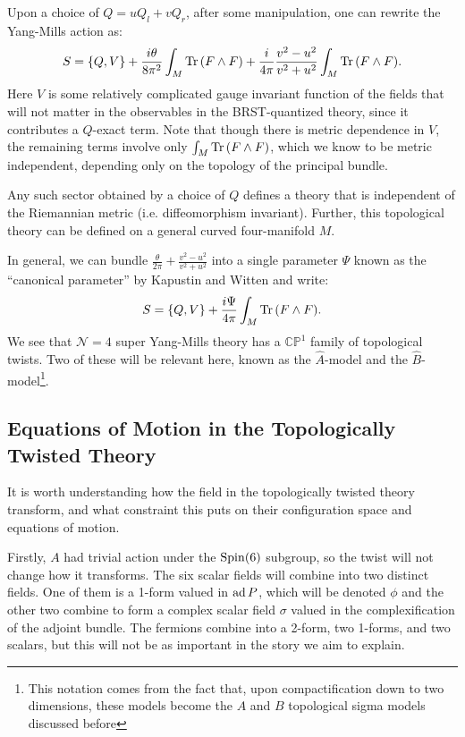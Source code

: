	Upon a choice of $Q = u Q_l + v Q_r$, after some manipulation, one can rewrite the Yang-Mills action as:
	\begin{equation}
		S = \{ Q , V \} + \frac{i \theta}{8\pi^2} \int_M \mathrm{Tr}\,(F \wedge F) + \frac{i}{4\pi} \frac{v^2-u^2}{v^2+u^2} \int_M \mathrm{Tr}\, (F \wedge F).
	\end{equation}
	Here $V$ is some relatively complicated gauge invariant function of the fields that will not matter in the observables in the BRST-quantized theory, since it contributes a $Q$-exact term. Note that though there is metric dependence in $V$, the remaining terms involve only $\int_M \mathrm{Tr}\, (F \wedge F)$, which we know to be metric independent, depending only on the topology of the principal bundle. 
	
	\begin{fact}
		Any such sector obtained by a choice of $Q$ defines a theory that is independent of the Riemannian metric (i.e. diffeomorphism invariant). Further, this topological theory can be defined on a general curved four-manifold $M$.
	\end{fact}
	
	In general, we can bundle $\frac{\theta}{2\pi} +  \frac{v^2-u^2}{v^2+u^2}$ into a single parameter $\Psi$ known as the ``canonical parameter'' by Kapustin and Witten \cite{kapustin2006} and write:
	\[
		S = \{ Q, V\} + \frac{i \Psi}{4\pi} \int_M \mathrm{Tr}\, (F \wedge F).
	\]
	We see that $\mathcal N = 4$ super Yang-Mills theory has a $\mathbb{CP}^1$ family of topological twists. 
	Two of these will be relevant here, known as the $\hat A$-model and the $\hat B$-model\footnote{This notation comes from the fact that, upon compactification down to two dimensions, these models become the $A$ and $B$ topological sigma models discussed before}. %
	

\subsection{Equations of Motion in the Topologically Twisted Theory} %
\label{sub:equations_of_motion_in_the_topologically_twisted_theory}

	It is worth understanding how the field in the topologically twisted theory transform, and what constraint this puts on their configuration space and equations of motion. 

	Firstly, $A$ had trivial action under the $\mathrm{Spin}(6)$ subgroup, so the twist will not change how it transforms. The six scalar fields will combine into two distinct fields. One of them is a 1-form valued in $\mathrm{ad}\, P$, which will be denoted $\phi$ and the other two combine to form a complex scalar field $\sigma$ valued in the complexification of the adjoint bundle. The fermions combine into a 2-form, two 1-forms, and two scalars, but this will not be as important in the story we aim to explain. 
	
